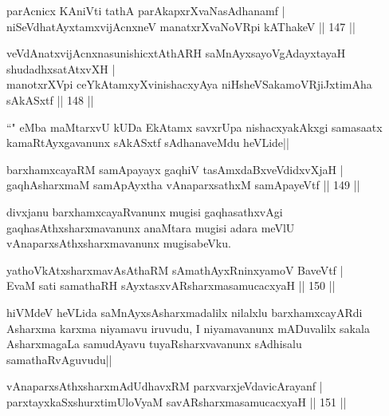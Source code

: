 
\begin{shl}
parAcnicx KAniVti tathA parAkapxrXvaNasAdhanamf |\\
niSeVdhatAyxtamxvijAcnxneV manatxrXvaNoVR\s pi kAThakeV \hfill || 147 ||
\end{shl}

\begin{shl}
veVdAnatxvijAcnxnasunishicxtAthARH  saMnAyxsayoVgAdayxtayaH shudadhxsatAtxvXH |\\
manotxrXV\s pi ceYkAtamxyXvinishacxyAya niHsheVSakamoVRjiJxtimAha sAkASxtf \hfill || 148 ||
\end{shl}

\begin{artha}
``\stext " eMba maMtarxvU kUDa EkAtamx savxrUpa nishacxyakAkxgi samasaatx kamaRtAyxgavanunx sAkASxtf sAdhanaveMdu heVLide||
\end{artha}


\begin{shl}
barxhamxcayaRM samApayayx gaqhiV tasAmxdaBxveVdidxvXjaH |\\
gaqhAsharxmaM samApAyxtha vAnaparxsathxM samApayeVtf \hfill || 149 ||
\end{shl}

\begin{artha}
divxjanu barxhamxcayaRvanunx mugisi gaqhasathxvAgi gaqhasAthxsharxmavanunx anaMtara mugisi adara meVlU vAnaparxsAthxsharxmavanunx mugisabeVku.
\end{artha}


\begin{shl}
yathoVkAtxsharxmavAsAthaRM sAmathAyxRninxyamoV BaveVtf |\\
EvaM sati samathaRH sAyxtasxvARsharxmasamucacxyaH \hfill || 150 ||
\end{shl}

\begin{artha}
hiVMdeV heVLida saMnAyxsAsharxmadalilx nilalxlu barxhamxcayARdi Asharxma  karxma niyamavu iruvudu, I niyamavanunx mADuvalilx sakala AsharxmagaLa samudAyavu tuyaRsharxvavanunx sAdhisalu samathaRvAguvudu||
\end{artha}

\begin{shl}
vAnaparxsAthxsharxmAdUdhavxRM parxvarxjeVdavicArayanf |\\
parxtayxkaSxshurxtimUloV\s yaM savARsharxmasamucacxyaH \hfill || 151 ||
\end{shl}

